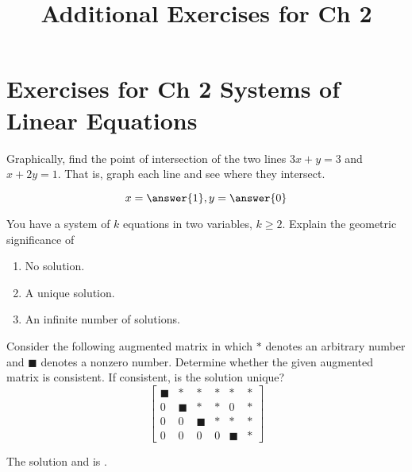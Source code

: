 \documentclass{ximera}
\title{Additional Exercises for Ch 2} \license{CC BY-NC-SA 4.0}
\begin{document}
\begin{abstract}
\end{abstract}
\maketitle

\section*{Exercises for Ch 2 Systems of Linear Equations}

\begin{problem}\label{prb:2.2}
Graphically, find the point of intersection of the two lines $
3x+y=3$ and $x+2y=1.$ That is, graph each line
and see where they intersect.

 $$x=\answer{1},y=\answer{0}$$
\end{problem}

\begin{problem}\label{prb:2.3} You have a system of $k$ equations in two variables, $k\geq 2$.
Explain the geometric significance of

\begin{enumerate}
\item No solution.

\item A unique solution.

\item An infinite number of solutions.
\end{enumerate}

\end{problem}

\begin{problem}\label{prb:2.4}
\label{Chapter1Q8}Consider the following augmented matrix in which $\ast $ denotes an
arbitrary number and $\blacksquare $ denotes a nonzero number. Determine
whether the given augmented matrix is consistent. If consistent, is the
solution unique?
\begin{equation*}
\left[
\begin{array}{ccccc|c}
\blacksquare & \ast & \ast & \ast & \ast & \ast \\
0 & \blacksquare & \ast & \ast & 0 & \ast \\
0 & 0 & \blacksquare & \ast & \ast & \ast \\
0 & 0 & 0 & 0 & \blacksquare & \ast
\end{array}
\right] 
\end{equation*}

The solution  and is .
\end{problem}
\end{document}
